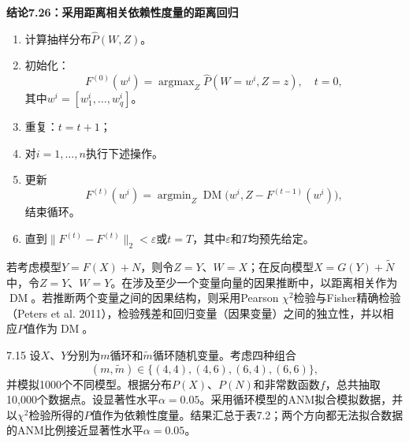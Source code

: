 \par\medskip{}\noindent\textbf{结论7.26：采用距离相关依赖性度量的距离回归}\par
\begin{enumerate}[label=\textbf{步骤\arabic*.},leftmargin=4.8em]
\item 计算抽样分布$\widehat P(W,Z)$。
\item 初始化：
\[
F^{(0)}(w^i)=\mathop{\arg\max}_{Z}\widehat P(W=w^i,Z=z),\quad t=0,
\]
其中$w^i=[w_1^i,\ldots,w_q^i]$。
\item 重复：$t=t+1$；
\item 对$i=1,\ldots,n$执行下述操作。
\item 更新
\[
F^{(t)}(w^i)=\mathop{\arg\min}_{Z}\operatorname{DM}\bigl(w^i,Z-F^{(t-1)}(w^i)\bigr),
\]
结束循环。
\item 直到$\|F^{(t)}-F^{(t)}\|_2<\varepsilon$或$t=T$，其中$\varepsilon$和$T$均预先给定。
\end{enumerate}
若考虑模型$Y=F(X)+N$，则令$Z=Y$、$W=X$；在反向模型$X=G(Y)+\widetilde N$中，令$Z=Y$、$W=Y$。在涉及至少一个变量向量的因果推断中，以距离相关作为$\operatorname{DM}$。若推断两个变量之间的因果结构，则采用Pearson $\chi^2$检验与Fisher精确检验（Peters et al. 2011），检验残差和回归变量（因果变量）之间的独立性，并以相应$P$值作为$\operatorname{DM}$。

\begin{bookexample}{7.15}
设$X$、$Y$分别为$m$循环和$\widetilde m$循环随机变量。考虑四种组合
\[
(m,\widetilde m)\in\{(4,4),(4,6),(6,4),(6,6)\},
\]
并模拟1000个不同模型。根据分布$P(X)$、$P(N)$和非常数函数$f$，总共抽取10,000个数据点。设显著性水平$\alpha=0.05$。采用循环模型的ANM拟合模拟数据，并以$\chi^2$检验所得的$P$值作为依赖性度量。结果汇总于表7.2；两个方向都无法拟合数据的ANM比例接近显著性水平$\alpha=0.05$。
\end{bookexample}
